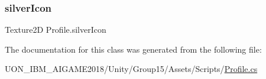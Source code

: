 \mbox{\label{class_profile_a78778870ae527b3457f77c117ace209e}} 
\subsubsection{\texorpdfstring{silverIcon}{silverIcon}}
{\footnotesize\ttfamily Texture2D Profile.\+silver\+Icon\hspace{0.3cm}{\ttfamily [private]}}



The documentation for this class was generated from the following file\+:\begin{DoxyCompactItemize}
\item 
U\+O\+N\+\_\+\+I\+B\+M\+\_\+\+A\+I\+G\+A\+M\+E2018/\+Unity/\+Group15/\+Assets/\+Scripts/\mbox{\hyperlink{_profile_8cs}{Profile.\+cs}}\end{DoxyCompactItemize}
